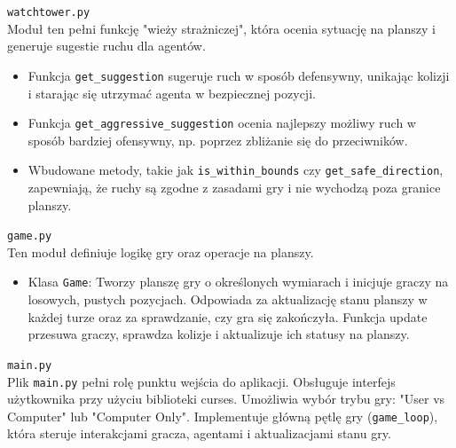 \documentclass[12pt,a4paper]{article}
\begin{document}
\verb|watchtower.py|\\
Moduł ten pełni funkcję "wieży strażniczej", która ocenia sytuację na planszy i generuje sugestie ruchu dla agentów.

    \begin{itemize}
        \item Funkcja \verb|get_suggestion| sugeruje ruch w sposób defensywny, unikając kolizji i starając się utrzymać agenta w bezpiecznej pozycji.
        \item Funkcja \verb|get_aggressive_suggestion| ocenia najlepszy możliwy ruch w sposób bardziej ofensywny, np. poprzez zbliżanie się do przeciwników.
        \item Wbudowane metody, takie jak \verb|is_within_bounds| czy \verb|get_safe_direction|, zapewniają, że ruchy są zgodne z zasadami gry i nie wychodzą poza granice planszy.
    \end{itemize}
\bigskip

\verb|game.py|\\
Ten moduł definiuje logikę gry oraz operacje na planszy.

    \begin{itemize}
        \item Klasa \verb|Game|:
Tworzy planszę gry o określonych wymiarach i inicjuje graczy na losowych, pustych pozycjach. Odpowiada za aktualizację stanu planszy w każdej turze oraz za sprawdzanie, czy gra się zakończyła. Funkcja update przesuwa graczy, sprawdza kolizje i aktualizuje ich statusy na planszy.
    \end{itemize}
\bigskip

\verb|main.py|\\
Plik \verb|main.py| pełni rolę punktu wejścia do aplikacji. Obsługuje interfejs użytkownika przy użyciu biblioteki curses. Umożliwia wybór trybu gry: "User vs Computer" lub "Computer Only". Implementuje główną pętlę gry (\verb|game_loop|), która steruje interakcjami gracza, agentami i aktualizacjami stanu gry.
\bigskip
\end{document}
